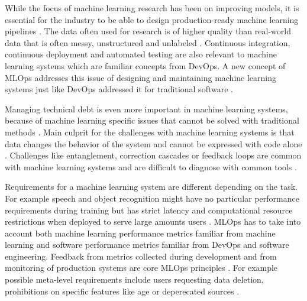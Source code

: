 While the focus of machine learning research  has been on improving models, it is essential for the industry to be able to design production-ready machine learning pipelines \parencite{posoldovaMachineLearningPipelines2020}. The data often used for research is of higher quality than real-world data that is often messy, unstructured and unlabeled \parencite{posoldovaMachineLearningPipelines2020}. Continuous integration, continuous deployment and automated testing are also relevant to machine learning systems \parencite{posoldovaMachineLearningPipelines2020} which are familiar concepts from DevOps. A new concept of MLOps addresses this issue of designing and maintaining machine learning systems just like DevOps addressed it for traditional software \parencite{kreuzbergerMachineLearningOperations2023}.

Managing technical debt is even more important in machine learning systems, because of machine learning specific issues that cannot be solved with traditional methods \parencite{sculleyHiddenTechnicalDebt2015a}. Main culprit for the challenges with machine learning systems is that data changes the behavior of the system and cannot be expressed with code alone \parencite{sculleyHiddenTechnicalDebt2015a}. Challenges like entanglement, correction cascades or feedback loops are common with machine learning systems and are difficult to diagnose with common tools \parencite{sculleyHiddenTechnicalDebt2015a}.

Requirements for a machine learning system are different depending on the task. For example speech and object recognition might have no particular performance requirements during training but has strict latency and computational resource restrictions when deployed to serve large amounts users \parencite{hintonDistillingKnowledgeNeural2015}. MLOps has to take into account both machine learning performance metrics familiar from machine learning and software performance metrics familiar from DevOps and software engineering. Feedback from metrics collected during development and from monitoring of production systems are core MLOps principles \parencite{kreuzbergerMachineLearningOperations2023}. For example possible meta-level requirements include users requesting data deletion, prohibitions on specific features like age or deperecated sources \parencite{breckMLTestScore2017a}.

